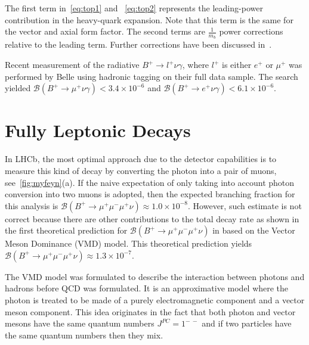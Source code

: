 The first term in~\autoref{eq:top1} and ~\autoref{eq:top2} represents the leading-power contribution in the heavy-quark expansion. Note that this term
is the same for the vector and axial form factor. The second terms are $\frac{1}{m_{b}}$ power corrections relative to the leading term. Further corrections have been discussed in~\cite{Wang:2016beq}.



Recent measurement of the radiative $B^{+} \rightarrow l^{+} \nu \gamma$, where $l^{+}$ is either $e^{+}$ or $\mu^{+}$ was performed by Belle using hadronic tagging on their full data sample\cite{Heller:2015vvm}. The search yielded $\mathcal{B}(B^{+}\rightarrow \mu^{+} \nu \gamma) < 3.4\times 10^{-6}$ and $\mathcal{B}(B^{+}\rightarrow e^{+} \nu \gamma) < 6.1\times 10^{-6}$.



\section{Fully Leptonic  Decays}
\label{mydecay}

In LHCb, the most optimal approach due to the detector capabilities is to measure this kind of decay by converting the photon into a pair of muons, see~\autoref{fig:myfeyn}(a). If the naive expectation of only taking into account photon conversion into two muons is adopted, then the expected branching fraction for this analysis is $\mathcal{B}(B^{+}\rightarrow \mu^{+} \mu^{-} \mu^{+} \nu) \approx 1.0\times 10^{-8}$. However, such estimate is not correct because there are other contributions to the total decay rate as shown in the first theoretical prediction for $\mathcal{B}(B^{+}\rightarrow \mu^{+} \mu^{-} \mu^{+} \nu)$ in \cite{Danilina:2018uzr} based on the Vector Meson Dominance (VMD) model. This theoretical prediction yields $\mathcal{B}(B^{+} \rightarrow \mu^{+} \mu^{-} \mu^{+} \nu) \approx 1.3\times 10^{-7}$.%

 The VMD model was formulated to describe the interaction between photons and hadrons before \gls{QCD} was formulated. It is an approximative model where the photon is treated to be made of a purely electromagnetic component and a vector meson component. This idea originates in the fact that both photon and vector mesons have the same quantum numbers $J^{PC} = 1^{-\ -}$ and if two particles have the same quantum numbers then they mix. %

